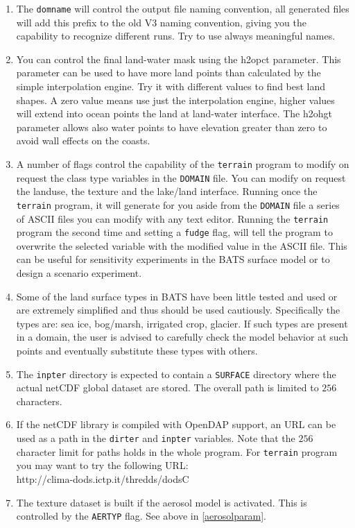 \begin{enumerate}
\item The \verb=domname= will control the output file naming convention, all
generated files will add this prefix to the old V3 naming convention,
giving you the capability to recognize different runs. Try to use always
meaningful names.
\item You can control the final land-water mask using the h2opct parameter.
This parameter can be used to have more land points than calculated by
the simple interpolation engine. Try it with different values to find best
land shapes. A zero value means use just the interpolation engine, higher
values will extend into ocean points the land at land-water interface.
The h2ohgt parameter allows also water points to have elevation greater
than zero to avoid wall effects on the coasts.
\item A number of flags control the capability of the \verb=terrain= program
to modify on request the class type variables in the \verb=DOMAIN= file. You can
modify on request the landuse, the texture and the lake/land interface.
Running once the \verb=terrain= program, it will generate for you aside from the
\verb=DOMAIN= file a series of ASCII files you can modify with any text
editor. Running the \verb=terrain= program the second time and setting
a \verb=fudge= flag, will tell the program to overwrite the selected
variable with the modified value in the ASCII file. This can be useful
for sensitivity experiments in the BATS surface model or to design
a scenario experiment.
\item Some of the land surface types in BATS have been little tested and used
or are extremely simplified and thus should be used cautiously. Specifically
the types are: sea ice, bog/marsh, irrigated crop, glacier. If such types are
present in a domain, the user is advised to carefully check the model behavior
at such points and eventually substitute these types with others.
\item The \verb=inpter= directory is expected to contain a \verb=SURFACE=
directory where the actual netCDF global dataset are stored. The overall
path is limited to $256$ characters.
\label{pathnote}
\item If the netCDF library is compiled with OpenDAP support, an URL
can be used as a path in the \verb=dirter= and \verb=inpter= variables.
Note that the $256$ character limit for paths holds in the whole program.
For \verb=terrain= program you may want to try the following URL: \\
http://clima-dods.ictp.it/thredds/dodsC
\item The texture dataset is built if the aerosol model is activated.
This is controlled by the \verb=AERTYP= flag. See above in \ref{aerosolparam}.
\end{enumerate}

